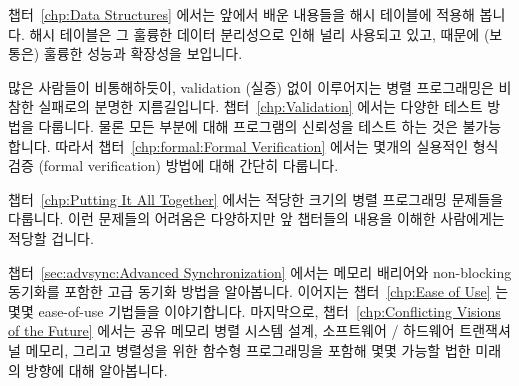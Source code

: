 챕터~\ref{chp:Data Structures} 에서는 앞에서 배운 내용들을 해시 테이블에 적용해
봅니다. 해시 테이블은 그 훌륭한 데이터 분리성으로 인해 널리 사용되고 있고,
때문에 (보통은) 훌륭한 성능과 확장성을 보입니다.

\iffalse
Chapter~\ref{chp:Data Structures} applies the lessons of previous
chapters to hash tables, which are heavily used due
to their excellent partitionability, which (usually) leads to excellent
performance and scalability.
\fi

많은 사람들이 비통해하듯이, validation (실증) 없이 이루어지는 병렬 프로그래밍은
비참한 실패로의 분명한 지름길입니다.
챕터~\ref{chp:Validation} 에서는 다양한 테스트 방법을 다룹니다.
물론 모든 부분에 대해 프로그램의 신뢰성을 테스트 하는 것은 불가능합니다.
따라서 챕터~\ref{chp:formal:Formal Verification} 에서는 몇개의 실용적인 형식
검증 (formal verification) 방법에 대해 간단히 다룹니다.

\iffalse
As many have learned to their sorrow, parallel programming without
validation is a sure path to abject failure.
Chapter~\ref{chp:Validation} covers various forms of testing.
It is of course impossible to test reliability into your program
after the fact, so Chapter~\ref{chp:formal:Formal Verification}
follows up with a brief overview of a couple of practical approaches to
formal verification.
\fi

챕터~\ref{chp:Putting It All Together} 에서는 적당한 크기의 병렬 프로그래밍
문제들을 다룹니다.
이런 문제들의 어려움은 다양하지만 앞 챕터들의 내용을 이해한 사람에게는 적당할
겁니다.

\iffalse
Chapter~\ref{chp:Putting It All Together}
contains a series of moderate-sized parallel programming problems.
The difficulty of these problems vary, but should be appropriate for
someone who has mastered the material in the previous chapters.
\fi

챕터~\ref{sec:advsync:Advanced Synchronization} 에서는 메모리 배리어와
non-blocking 동기화를 포함한 고급 동기화 방법을 알아봅니다.
이어지는 챕터~\ref{chp:Ease of Use} 는 몇몇 ease-of-use 기법들을 이야기합니다.
마지막으로, 챕터~\ref{chp:Conflicting Visions of the Future} 에서는 공유 메모리
병렬 시스템 설계, 소프트웨어 / 하드웨어 트랜잭셔널 메모리, 그리고 병렬성을 위한
함수형 프로그래밍을 포함해 몇몇 가능할 법한 미래의 방향에 대해 알아봅니다.

\iffalse
Chapter~\ref{sec:advsync:Advanced Synchronization}
looks at advanced synchronization methods, including memory barriers
and non-blocking synchronization.
Chapter~\ref{chp:Ease of Use} follows up with some ease-of-use advice.
Finally, Chapter~\ref{chp:Conflicting Visions of the Future}
looks at a few possible future directions, including
shared-memory parallel system design, software and hardware transactional
memory, and functional programming for parallelism.
\fi


